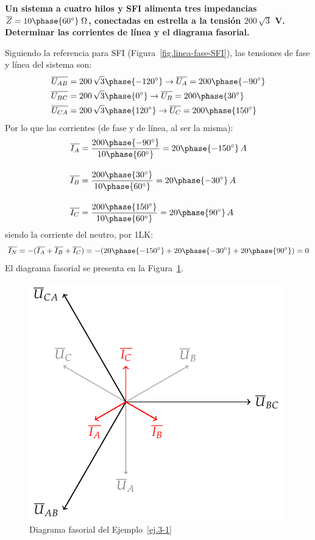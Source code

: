 \documentclass[11pt]{book} %
\begin{document}
    \vspace{4mm}
    \begin{example}\label{ej.3-1}
	    \textbf{Un sistema a cuatro hilos y SFI alimenta tres impedancias $\overline{Z}=10\phase{60^\circ}\;\Omega$, conectadas en estrella a la tensión $200\,\sqrt{3}$ V. Determinar las corrientes de línea y el diagrama fasorial.}
	    
	    Siguiendo la referencia para SFI (Figura~\ref{fig.linea-fase-SFI}), las tensiones de fase y línea del sistema son:
	    \begin{align*}
	        \overline{U_{AB}}&=200\,\sqrt{3}\phase{-120^\circ}\rightarrow \overline{U_A}=200\phase{-90^\circ}\\
	        \overline{U_{BC}}&=200\,\sqrt{3}\phase{0^\circ}\rightarrow \overline{U_B}=200\phase{30^\circ}\\
	        \overline{U_{CA}}&=200\,\sqrt{3}\phase{120^\circ}\rightarrow \overline{U_C}=200\phase{150^\circ}
	    \end{align*}
	    Por lo que las corrientes (de fase y de línea, al ser la misma):
	    \begin{align*}
	        \overline{I_A} &= \frac{200\phase{-90^\circ}}{10\phase{60^\circ}} =20\phase{-150^\circ} \,A \\[10pt]
          \overline{I_B} &= \frac{200\phase{30^\circ}}{10\phase{60^\circ}} = 20\phase{-30^\circ} \,A\\[10pt]
          \overline{I_C} &=\frac{200\phase{150^\circ}}{10\phase{60^\circ}} = 20\phase{90^\circ} \,A
	    \end{align*}
	    siendo la corriente del neutro, por 1LK:
	    \begin{equation*}
	        \overline{I_N}=-(\overline{I_A}+\overline{I_B}+\overline{I_C})=-(20\phase{-150^\circ}+20\phase{-30^\circ}+20\phase{90^\circ})=0
	    \end{equation*}
	    El diagrama fasorial se presenta en la Figura~\ref{fig.diagrama_ejemplo_3-1}. 
	    \begin{figure}[H]
	        \centering
	        \includegraphics[width=0.4\linewidth]{../figs/diagrama_ejemplo3_1.pdf}
	        \caption{Diagrama fasorial del Ejemplo~\ref{ej.3-1}}
	        \label{fig.diagrama_ejemplo_3-1}
	    \end{figure}
	\end{example}
	
\end{document}
